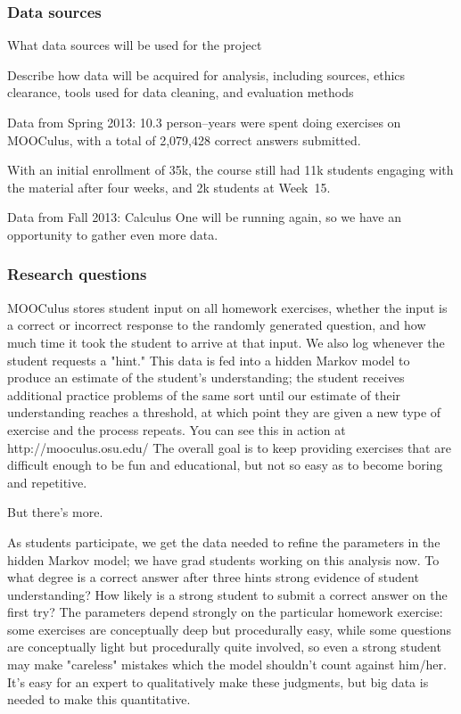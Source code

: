 \documentclass[12pt]{article}
\begin{document}
\subsubsection*{Data sources}

What data sources will be used for the project

Describe how data will be acquired for analysis, including sources,
ethics clearance, tools used for data cleaning, and evaluation
methods

Data from Spring 2013: 10.3 person--years were spent doing exercises
on MOOCulus, with a total of 2,079,428 correct answers submitted.

With an initial enrollment of 35k, the course still had 11k students
engaging with the material after four weeks, and 2k students at
Week~15.

Data from Fall 2013: Calculus One will be running again, so we have an
opportunity to gather even more data.

\subsubsection*{Research questions}






MOOCulus stores student input on all homework exercises, whether the
input is a correct or incorrect response to the randomly generated
question, and how much time it took the student to arrive at that
input.  We also log whenever the student requests a "hint."  This data
is fed into a hidden Markov model to produce an estimate of the
student's understanding; the student receives additional practice
problems of the same sort until our estimate of their understanding
reaches a threshold, at which point they are given a new type of
exercise and the process repeats.  You can see this in action at
http://mooculus.osu.edu/ The overall goal is to keep providing
exercises that are difficult enough to be fun and educational, but not
so easy as to become boring and repetitive.

But there's more.

As students participate, we get the data needed to refine the
parameters in the hidden Markov model; we have grad students working
on this analysis now.  To what degree is a correct answer after three
hints strong evidence of student understanding?  How likely is a
strong student to submit a correct answer on the first try?  The
parameters depend strongly on the particular homework exercise: some
exercises are conceptually deep but procedurally easy, while some
questions are conceptually light but procedurally quite involved, so
even a strong student may make "careless" mistakes which the model
shouldn't count against him/her.  It's easy for an expert to
qualitatively make these judgments, but big data is needed to make
this quantitative.
\end{document}
